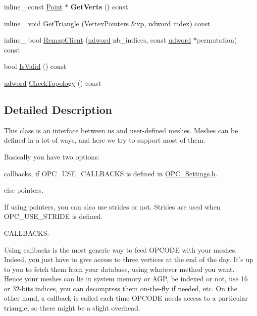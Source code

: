 \begin{DoxyCompactItemize}
\item 
\hypertarget{class_mesh_interface_ac2ba230f02dbec05b265c31b1f76bed3}{inline\+\_\+ const \hyperlink{class_point}{Point} $\ast$ {\bfseries Get\+Verts} () const }\label{class_mesh_interface_ac2ba230f02dbec05b265c31b1f76bed3}

\item 
inline\+\_\+ void \hyperlink{class_mesh_interface_ae2ce7bb92b4a2825147c33616114f2c1}{Get\+Triangle} (\hyperlink{struct_vertex_pointers}{Vertex\+Pointers} \&vp, \hyperlink{_ice_types_8h_a44c6f1920ba5551225fb534f9d1a1733}{udword} index) const 
\item 
inline\+\_\+ bool \hyperlink{class_mesh_interface_a7507e521cb4cd844960dd5e24eba937a}{Remap\+Client} (\hyperlink{_ice_types_8h_a44c6f1920ba5551225fb534f9d1a1733}{udword} nb\+\_\+indices, const \hyperlink{_ice_types_8h_a44c6f1920ba5551225fb534f9d1a1733}{udword} $\ast$permutation) const 
\item 
bool \hyperlink{class_mesh_interface_a28e02f1fa9f6d41523fae3f8649fcdb5}{Is\+Valid} () const 
\item 
\hyperlink{_ice_types_8h_a44c6f1920ba5551225fb534f9d1a1733}{udword} \hyperlink{class_mesh_interface_a27f3838ddf40b99457039bf161fc2aa7}{Check\+Topology} () const 
\end{DoxyCompactItemize}


\subsection{Detailed Description}
This class is an interface between us and user-\/defined meshes. Meshes can be defined in a lot of ways, and here we try to support most of them.

Basically you have two options\+:
\begin{DoxyItemize}
\item callbacks, if O\+P\+C\+\_\+\+U\+S\+E\+\_\+\+C\+A\+L\+L\+B\+A\+C\+K\+S is defined in \hyperlink{_o_p_c___settings_8h}{O\+P\+C\+\_\+\+Settings.\+h}.
\item else pointers.
\end{DoxyItemize}

If using pointers, you can also use strides or not. Strides are used when O\+P\+C\+\_\+\+U\+S\+E\+\_\+\+S\+T\+R\+I\+D\+E is defined.

C\+A\+L\+L\+B\+A\+C\+K\+S\+:

Using callbacks is the most generic way to feed O\+P\+C\+O\+D\+E with your meshes. Indeed, you just have to give access to three vertices at the end of the day. It's up to you to fetch them from your database, using whatever method you want. Hence your meshes can lie in system memory or A\+G\+P, be indexed or not, use 16 or 32-\/bits indices, you can decompress them on-\/the-\/fly if needed, etc. On the other hand, a callback is called each time O\+P\+C\+O\+D\+E needs access to a particular triangle, so there might be a slight overhead.

